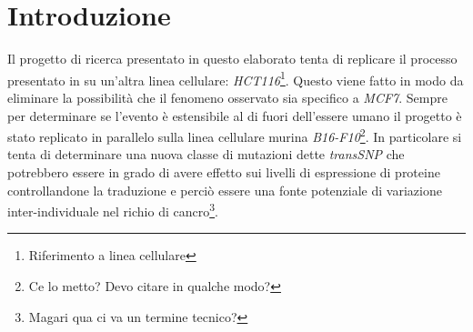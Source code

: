 \chapter{Introduzione}
\label{cha:intro}




Il progetto di ricerca presentato in questo elaborato tenta di replicare il processo presentato in \cite{transsnp} su un'altra linea cellulare: \emph{HCT116}\footnote{Riferimento a linea cellulare}.
Questo viene fatto in modo da eliminare la possibilit\`a che il fenomeno osservato sia specifico a \emph{MCF7}.
Sempre per determinare se l'evento \`e estensibile al di fuori dell'essere umano il progetto \`e stato replicato in parallelo sulla linea cellulare murina \emph{B16-F10}\footnote{Ce lo metto? Devo citare in qualche modo?}.
In particolare si tenta di determinare una nuova classe di mutazioni dette \emph{transSNP} che potrebbero essere in grado di avere effetto sui livelli di espressione di proteine controllandone la traduzione e perci\`o essere una fonte potenziale di variazione inter-individuale nel richio di cancro\footnote{Magari qua ci va un termine tecnico?}.

